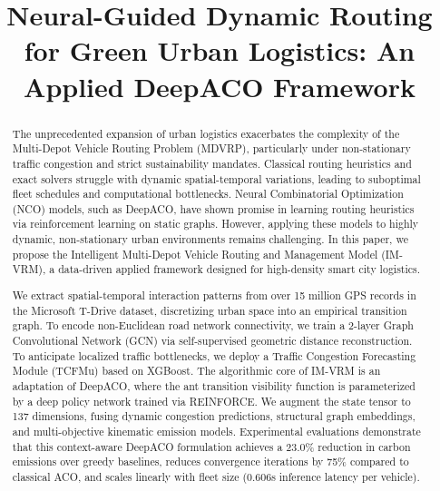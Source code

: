 \documentclass[conference]{IEEEtran}
\begin{document}
\title{Neural-Guided Dynamic Routing for Green Urban Logistics: An Applied DeepACO Framework}

\author{
}

\maketitle

\begin{abstract}
The unprecedented expansion of urban logistics exacerbates the complexity of the Multi-Depot Vehicle Routing Problem (MDVRP), particularly under non-stationary traffic congestion and strict sustainability mandates. Classical routing heuristics and exact solvers struggle with dynamic spatial-temporal variations, leading to suboptimal fleet schedules and computational bottlenecks. Neural Combinatorial Optimization (NCO) models, such as DeepACO, have shown promise in learning routing heuristics via reinforcement learning on static graphs. However, applying these models to highly dynamic, non-stationary urban environments remains challenging. In this paper, we propose the Intelligent Multi-Depot Vehicle Routing and Management Model (IM-VRM), a data-driven applied framework designed for high-density smart city logistics. 

We extract spatial-temporal interaction patterns from over 15 million GPS records in the Microsoft T-Drive dataset, discretizing urban space into an empirical transition graph. To encode non-Euclidean road network connectivity, we train a 2-layer Graph Convolutional Network (GCN) via self-supervised geometric distance reconstruction. To anticipate localized traffic bottlenecks, we deploy a Traffic Congestion Forecasting Module (TCFMu) based on XGBoost. The algorithmic core of IM-VRM is an adaptation of DeepACO, where the ant transition visibility function is parameterized by a deep policy network trained via REINFORCE. We augment the state tensor to 137 dimensions, fusing dynamic congestion predictions, structural graph embeddings, and multi-objective kinematic emission models. Experimental evaluations demonstrate that this context-aware DeepACO formulation achieves a 23.0\% reduction in carbon emissions over greedy baselines, reduces convergence iterations by 75\% compared to classical ACO, and scales linearly with fleet size (0.606s inference latency per vehicle).
\end{abstract}
\end{document}
